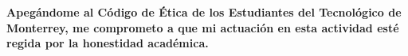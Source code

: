 \documentclass[spanish, 10pt]{article}
\begin{document}


\vfill

\textbf{Apegándome al Código de Ética de los Estudiantes del Tecnológico de Monterrey, me comprometo a que mi actuación en esta actividad esté regida por la honestidad académica.}
\end{document}
